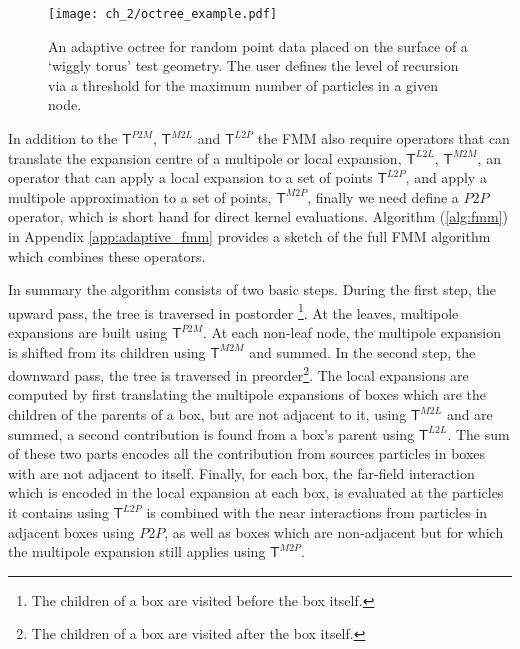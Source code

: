 \begin{figure}
    \centering
    \texttt{[image: ch\_2/octree\_example.pdf]}
    \caption{An adaptive octree for random point data placed on the surface of a `wiggly torus' test geometry. The user defines the level of recursion via a threshold for the maximum number of particles in a given node.}
    \label{fig:chpt:2:sec:0:octree_example}
\end{figure}

In addition to the $\mathsf{T}^{P2M}$, $\mathsf{T}^{M2L}$ and $\mathsf{T}^{L2P}$ the FMM also require operators that can translate the expansion centre of a multipole or local expansion, $\mathsf{T}^{L2L}$, $\mathsf{T}^{M2M}$, an operator that can apply a local expansion to a set of points $\mathsf{T}^{L2P}$, and apply a multipole approximation to a set of points, $\mathsf{T}^{M2P}$, finally we need define a $P2P$ operator, which is short hand for direct kernel evaluations. Algorithm (\ref{alg:fmm}) in Appendix \ref{app:adaptive_fmm} provides a sketch of the full FMM algorithm which combines these operators.

In summary the algorithm consists of two basic steps. During the first step, the upward pass, the tree is traversed in postorder \footnote{The children of a box are visited before the box itself.}. At the leaves, multipole expansions are built using $\mathsf{T}^{P2M}$. At each non-leaf node, the multipole expansion is shifted from its children using $\mathsf{T}^{M2M}$ and summed. In the second step, the downward pass, the tree is traversed in preorder\footnote{The children of a box are visited after the box itself.}. The local expansions are computed by first translating the multipole expansions of boxes which are the children of the parents of a box, but are not adjacent to it, using $\mathsf{T}^{M2L}$ and are summed, a second contribution is found from a box's parent using $\mathsf{T}^{L2L}$. The sum of these two parts encodes all the contribution from sources particles in boxes with are not adjacent to itself. Finally, for each box, the far-field interaction which is encoded in the local expansion at each box, is evaluated at the particles it contains using $\mathsf{T}^{L2P}$ is combined with the near interactions from particles in adjacent boxes using $P2P$, as well as boxes which are non-adjacent but for which the multipole expansion still applies using $\mathsf{T}^{M2P}$.
